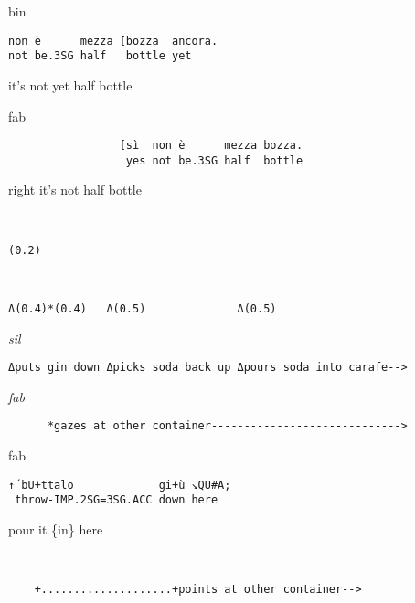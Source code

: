 \documentclass[output=paper,modfonts]{langscibook}
\begin{document}
\vspace{2mm}
%
\begin{transbox}{1}{bin}
\begin{verbatim}
non è      mezza [bozza  ancora.
not be.3SG half   bottle yet
\end{verbatim}
it's not yet half bottle
\end{transbox}\vspace{0.5mm}
%
\begin{transbox}{2}{fab}
\begin{verbatim}
                 [sì  non è      mezza bozza.
                  yes not be.3SG half  bottle
\end{verbatim}
\hspace{2.6cm} right it's not half bottle
\end{transbox}\vspace{-0.5mm}
%
\begin{transbox}{3}{~}
\begin{verbatim}
(0.2)
\end{verbatim}
\end{transbox}
%
\begin{transbox}{4}{~}
\begin{verbatim}
Δ(0.4)*(0.4)   Δ(0.5)              Δ(0.5)
\end{verbatim}
\end{transbox}
%
\begin{transbox}{5}{\textit{sil}}
\begin{verbatim}
Δputs gin down Δpicks soda back up Δpours soda into carafe-->
\end{verbatim}
\end{transbox}
%
\begin{transbox}{6}{\textit{fab}}
\begin{verbatim}
      *gazes at other container----------------------------->
\end{verbatim}
\end{transbox}
%
\begin{mdframednoverticalspace}[style=firstfoc]
\begin{transbox}{7}{fab}
\begin{verbatim}
↑´bU+ttalo             gi+ù ↘QU#A;
 throw-IMP.2SG=3SG.ACC down here
\end{verbatim}
\hspace{0.07cm} pour it \{in\} here
\end{transbox}
\end{mdframednoverticalspace}
%
\begin{transbox}{8}{~}
\begin{verbatim}
    +....................+points at other container-->
\end{verbatim}
\end{transbox}
\end{document}
